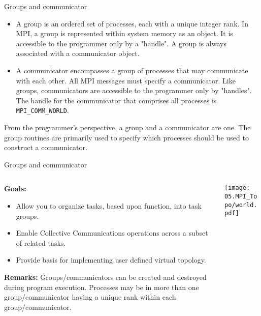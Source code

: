 \documentclass[aspectratio=43]{beamer}
\begin{document}
\begin{frame}[fragile]{Groups and communicator}
\begin{itemize}
\item A group is an ordered set of processes, each with a unique integer rank. In MPI, a group is represented within system memory as an object. It is accessible to the programmer only by a "handle". A group is always associated with a communicator object.
\item A communicator encompasses a group of processes that may communicate with each other. All MPI messages must specify a communicator. Like groups, communicators are accessible to the programmer only by "handles". The handle for the communicator that comprises all processes is \verb+MPI_COMM_WORLD+.
\end{itemize}
From the programmer's perspective, a group and a communicator are
one. The group routines are primarily used to specify which
processes should be used to construct a communicator.
\end{frame}

\begin{frame}[fragile]{Groups and communicator}
\begin{columns}
\begin{column}{0.5\paperwidth}
\textbf{Goals:}
\begin{itemize}
\item Allow you to organize tasks, based upon function, into task groups.
\item Enable Collective Communications operations across a subset of related tasks.
\item Provide basis for implementing user defined virtual topology.
\end{itemize}
\textbf{Remarks:}
Groups/communicators can be created and destroyed during program execution.
Processes may be in more than one group/communicator having a unique rank within each group/communicator.
\end{column}
\begin{column}{0.5\paperwidth}
\texttt{[image: 05.MPI\_Topo/world.pdf]}
\end{column}
\end{columns}
\end{frame}

%
%
%
%
\end{document}
